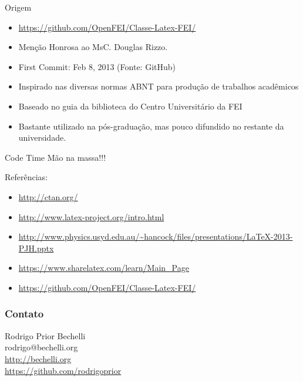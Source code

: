 \documentclass{beamer}
\begin{document}
\begin{frame}{Origem}
    \begin{itemize}
        \item  \url{https://github.com/OpenFEI/Classe-Latex-FEI/}
        \item Menção Honrosa ao MsC. Douglas Rizzo.
        \item First Commit: Feb 8, 2013 (Fonte: GitHub)
        \item Inspirado nas diversas normas ABNT para produção de trabalhos acadêmicos
        \item Baseado no guia da biblioteca do Centro Universitário da FEI
        \item Bastante utilizado na pós-graduação, mas pouco difundido no restante da universidade.
    \end{itemize}
\end{frame}


\begin{frame}{Code Time}
    Mão na massa!!!
\end{frame}


\begin{frame}
    Referências:
    \begin{itemize}
        \item \url{http://ctan.org/}
        \item \url{http://www.latex-project.org/intro.html}
        \item \url{http://www.physics.usyd.edu.au/~hancock/files/presentations/LaTeX-2013-PJH.pptx}
        \item \url{https://www.sharelatex.com/learn/Main_Page}
        \item \url{https://github.com/OpenFEI/Classe-Latex-FEI/}
    \end{itemize}
\end{frame}


\begin{frame}
    \frametitle{Contato}
    \begin{center}
        Rodrigo Prior Bechelli \\
        rodrigo@bechelli.org \\
        \url{http://bechelli.org} \\
        \url{https://github.com/rodrigoprior}
    \end{center}
\end{frame}
\end{document}
